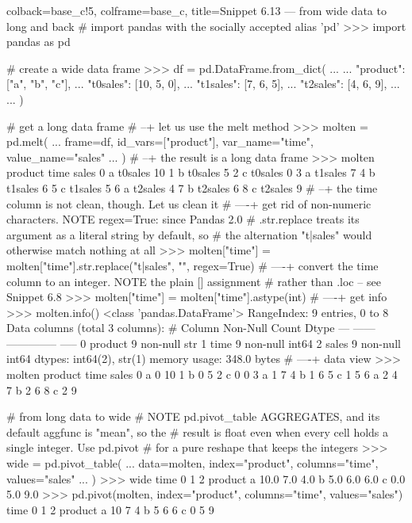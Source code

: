 \documentclass[a4paper,11pt]{book}
\begin{document}
\begin{pythoncode}[linenos=True]{colback=base_c!5, colframe=base_c, title=\sffamily Snippet 6.13 --- from wide data to long and back}
# import pandas with the socially accepted alias 'pd'
>>> import pandas as pd

# create a wide data frame
>>> df = pd.DataFrame.from_dict(
...     {
...         "product": ["a", "b", "c"],
...         "t0sales": [10, 5, 0],
...         "t1sales": [7, 6, 5],
...         "t2sales": [4, 6, 9],
...     }
...     )

# get a long data frame
# --+ let us use the melt method
>>> molten = pd.melt(
...     frame=df, id_vars=["product"], var_name="time", value_name="sales"
...     )
# --+ the result is a long data frame
>>> molten
  product     time  sales
0       a  t0sales     10
1       b  t0sales      5
2       c  t0sales      0
3       a  t1sales      7
4       b  t1sales      6
5       c  t1sales      5
6       a  t2sales      4
7       b  t2sales      6
8       c  t2sales      9
# --+ the time column is not clean, though. Let us clean it
# ----+ get rid of non-numeric characters. NOTE regex=True: since Pandas 2.0
#       .str.replace treats its argument as a literal string by default, so
#       the alternation "t|sales" would otherwise match nothing at all
>>> molten["time"] = molten["time"].str.replace("t|sales", "", regex=True)
# ----+ convert the time column to an integer. NOTE the plain [] assignment
#       rather than .loc -- see Snippet 6.8
>>> molten["time"] = molten["time"].astype(int)
# ----+ get info
>>> molten.info()
<class 'pandas.DataFrame'>
RangeIndex: 9 entries, 0 to 8
Data columns (total 3 columns):
 #   Column   Non-Null Count  Dtype
---  ------   --------------  -----
 0   product  9 non-null      str  
 1   time     9 non-null      int64
 2   sales    9 non-null      int64
dtypes: int64(2), str(1)
memory usage: 348.0 bytes
# ----+ data view
>>> molten
  product  time  sales
0       a     0     10
1       b     0      5
2       c     0      0
3       a     1      7
4       b     1      6
5       c     1      5
6       a     2      4
7       b     2      6
8       c     2      9

# from long data to wide
# NOTE pd.pivot_table AGGREGATES, and its default aggfunc is "mean", so the
# result is float even when every cell holds a single integer. Use pd.pivot
# for a pure reshape that keeps the integers
>>> wide = pd.pivot_table(
...     data=molten, index="product", columns="time", values="sales"
...     )
>>> wide
time        0    1    2
product                
a        10.0  7.0  4.0
b         5.0  6.0  6.0
c         0.0  5.0  9.0
>>> pd.pivot(molten, index="product", columns="time", values="sales")
time      0  1  2
product          
a        10  7  4
b         5  6  6
c         0  5  9
\end{pythoncode}
\clearpage
\end{document}
